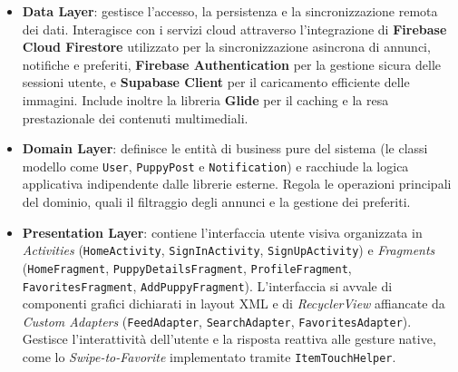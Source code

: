 \documentclass[a4paper]{report}
\begin{document}
\begin{itemize}
    \item \textbf{Data Layer}: gestisce l'accesso, la persistenza e la sincronizzazione remota dei dati. Interagisce con i servizi cloud attraverso l'integrazione di \textbf{Firebase Cloud Firestore} utilizzato per la sincronizzazione asincrona di annunci, notifiche e preferiti, \textbf{Firebase Authentication} per la gestione sicura delle sessioni utente, e \textbf{Supabase Client} per il caricamento efficiente delle immagini. Include inoltre la libreria \textbf{Glide} per il caching e la resa prestazionale dei contenuti multimediali.
    
    \item \textbf{Domain Layer}: definisce le entità di business pure del sistema (le classi modello come \texttt{User}, \texttt{PuppyPost} e \texttt{Notification}) e racchiude la logica applicativa indipendente dalle librerie esterne. Regola le operazioni principali del dominio, quali il filtraggio degli annunci e la gestione dei preferiti.
    
    \item \textbf{Presentation Layer}: contiene l'interfaccia utente visiva organizzata in \textit{Activities} (\texttt{HomeActivity}, \texttt{SignInActivity}, \texttt{SignUpActivity}) e \textit{Fragments} (\texttt{HomeFragment}, \texttt{PuppyDetailsFragment}, \texttt{ProfileFragment}, \texttt{FavoritesFragment}, \texttt{AddPuppyFragment}). L'interfaccia si avvale di componenti grafici dichiarati in layout XML e di \textit{RecyclerView} affiancate da \textit{Custom Adapters} (\texttt{FeedAdapter}, \texttt{SearchAdapter}, \texttt{FavoritesAdapter}). Gestisce l'interattività dell'utente e la risposta reattiva alle gesture native, come lo \textit{Swipe-to-Favorite} implementato tramite \texttt{ItemTouchHelper}.
\end{itemize}
\end{document}
